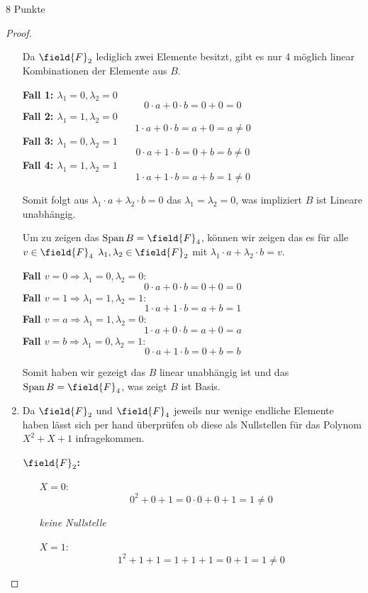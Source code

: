 \documentclass{../problemset}
\begin{document}
\begin{problem}{8 Punkte}
\begin{proof}
\begin{enumerate}
		      Da $\field{F}_2$ lediglich zwei Elemente besitzt, gibt es nur 4 möglich linear Kombinationen der Elemente aus $B$.

		      \textbf{Fall 1: $\lambda_1 = 0, \lambda_2 = 0$}
		      \[
			      0 \cdot a + 0 \cdot b = 0 + 0 = 0
		      \]
		      \textbf{Fall 2: $\lambda_1 = 1, \lambda_2 = 0$}
		      \[
			      1 \cdot a + 0 \cdot b = a + 0 = a \neq 0
		      \]
		      \textbf{Fall 3: $\lambda_1 = 0, \lambda_2 = 1$}
		      \[
			      0 \cdot a + 1 \cdot b = 0 + b = b \neq 0
		      \]
		      \textbf{Fall 4: $\lambda_1 = 1, \lambda_2 = 1$}
		      \[
			      1 \cdot a + 1 \cdot b = a + b = 1 \neq 0
		      \]

		      Somit folgt aus $\lambda_1 \cdot a + \lambda_2 \cdot b = 0$ das $\lambda_1 = \lambda_2 = 0$, was impliziert $B$ ist Lineare unabhängig. \checkmark

		      Um zu zeigen das $\operatorname{Span} B = \field{F}_4$, können wir zeigen das es für alle $v \in \field{F}_4$ $\lambda_1, \lambda_2 \in \field{F}_2$ mit $\lambda_1 \cdot a + \lambda_2 \cdot b = v$.

		      \textbf{Fall $v = 0 \Rightarrow \lambda_1 = 0, \lambda_2 = 0$}:
		      \[
			      0 \cdot a + 0 \cdot b = 0 + 0 = 0
		      \]
		      \textbf{Fall $v = 1 \Rightarrow \lambda_1 = 1, \lambda_2 = 1$}:
		      \[
			      1 \cdot a + 1 \cdot b = a + b = 1
		      \]
		      \textbf{Fall $v = a \Rightarrow \lambda_1 = 1, \lambda_2 = 0$}:
		      \[
			      1 \cdot a + 0 \cdot b = a + 0 = a
		      \]
		      \textbf{Fall $v = b \Rightarrow \lambda_1 = 0, \lambda_2 = 1$}:
		      \[
			      0 \cdot a + 1 \cdot b = 0 + b = b
		      \]

		      Somit haben wir gezeigt das $B$ linear unabhängig ist und das $\operatorname{Span} B = \field{F}_4$, was zeigt $B$ ist Basis.
		\item Da $\field{F}_2$ und $\field{F}_4$ jeweils nur wenige endliche Elemente haben lässt sich per hand überprüfen ob diese als Nullstellen für das Polynom $X^2 + X + 1$ infragekommen.

		      \textbf{$\field{F}_2$:}
		      \begin{itemize}
			      \item [$X = 0$:]
			            \[
				            0^2 + 0 + 1 = 0 \cdot 0 + 0 + 1 = 1 \neq 0
			            \]

			            \textit{keine Nullstelle}

			      \item [$X = 1$:]
			            \[
				            1^2 + 1 + 1 = 1 + 1 + 1 = 0 + 1 = 1 \neq 0
			            \]


\end{itemize}
\end{enumerate}
\end{proof}
\end{problem}
\end{document}
